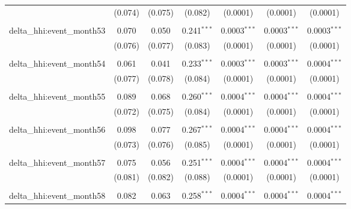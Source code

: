 \begin{table}[H]
{\begin{tabular}{@{\extracolsep{5pt}}lcccccc}
   & (0.074) & (0.075) & (0.082) & (0.0001) & (0.0001) & (0.0001) \\  

   & & & & & & \\  

  delta\_hhi:event\_month53 & 0.070 & 0.050 & 0.241$^{***}$ & 0.0003$^{***}$ & 0.0003$^{***}$ & 0.0003$^{***}$ \\  

   & (0.076) & (0.077) & (0.083) & (0.0001) & (0.0001) & (0.0001) \\  

   & & & & & & \\  

  delta\_hhi:event\_month54 & 0.061 & 0.041 & 0.233$^{***}$ & 0.0003$^{***}$ & 0.0003$^{***}$ & 0.0004$^{***}$ \\  

   & (0.077) & (0.078) & (0.084) & (0.0001) & (0.0001) & (0.0001) \\  

   & & & & & & \\  

  delta\_hhi:event\_month55 & 0.089 & 0.068 & 0.260$^{***}$ & 0.0004$^{***}$ & 0.0004$^{***}$ & 0.0004$^{***}$ \\  

   & (0.072) & (0.075) & (0.084) & (0.0001) & (0.0001) & (0.0001) \\  

   & & & & & & \\  

  delta\_hhi:event\_month56 & 0.098 & 0.077 & 0.267$^{***}$ & 0.0004$^{***}$ & 0.0004$^{***}$ & 0.0004$^{***}$ \\  

   & (0.073) & (0.076) & (0.085) & (0.0001) & (0.0001) & (0.0001) \\  

   & & & & & & \\  

  delta\_hhi:event\_month57 & 0.075 & 0.056 & 0.251$^{***}$ & 0.0004$^{***}$ & 0.0004$^{***}$ & 0.0004$^{***}$ \\  

   & (0.081) & (0.082) & (0.088) & (0.0001) & (0.0001) & (0.0001) \\  

   & & & & & & \\  

  delta\_hhi:event\_month58 & 0.082 & 0.063 & 0.258$^{***}$ & 0.0004$^{***}$ & 0.0004$^{***}$ & 0.0004$^{***}$ \\  


\end{tabular}}
\end{table}
